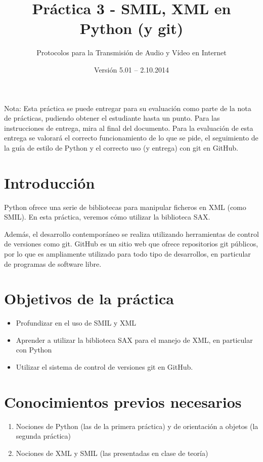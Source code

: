 \documentclass[11pt,a4paper]{article}
\begin{document}
\title{Práctica 3 - SMIL, XML en Python (y git)}
\author{Protocolos para la Transmisión de Audio y Vídeo en Internet}
\date{Versión 5.01 – 2.10.2014}


\maketitle


Nota: Esta práctica se puede entregar para su evaluación como parte de la nota de prácticas, pudiendo obtener el estudiante hasta un punto. Para las instrucciones de entrega, mira al final del documento. Para la evaluación de esta entrega se valorará el correcto funcionamiento de lo que se pide, el seguimiento de la guía de estilo de Python y el correcto uso (y entrega) con git en GitHub.

\section{Introducción}

Python ofrece una serie de bibliotecas para manipular ficheros en XML (como SMIL). En esta práctica, veremos cómo utilizar la biblioteca SAX.

Además, el desarrollo contemporáneo se realiza utilizando herramientas de control de versiones como git. GitHub es un sitio web que ofrece repositorios git públicos, por lo que es ampliamente utilizado para todo tipo de desarrollos, en particular de programas de software libre.

\section{Objetivos de la práctica}

\begin{itemize}
  \item Profundizar en el uso de SMIL y XML
  \item Aprender a utilizar la biblioteca SAX para el manejo de XML, en particular con Python
  \item Utilizar el sistema de control de versiones git en GitHub.
\end{itemize}

\section{Conocimientos previos necesarios}

\begin{enumerate}
  \item Nociones de Python (las de la primera práctica) y de orientación a objetos (la segunda práctica)
  \item Nociones de XML y SMIL (las presentadas en clase de teoría)
\end{enumerate}
\end{document}
